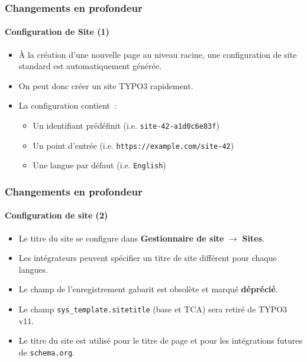 
\begin{frame}[fragile]
	\frametitle{Changements en profondeur}
	\framesubtitle{Configuration de Site (1)}

	\begin{itemize}
		\item À la création d'une nouvelle page au niveau racine, une configuration
			de site standard est automatiquement générée.
		\item On peut donc créer un site TYPO3 rapidement.
		\item La configuration contient~:

			\begin{itemize}
				\item Un identifiant prédéfinit (i.e. \texttt{site-42-a1d0c6e83f})
				\item Un point d'entrée (i.e. \texttt{https://example.com/site-42})
				\item Une langue par défaut (i.e. \texttt{English})
			\end{itemize}

	\end{itemize}

\end{frame}


\begin{frame}[fragile]
	\frametitle{Changements en profondeur}
	\framesubtitle{Configuration de site (2)}

	\begin{itemize}

		\item Le titre du site se configure dans
			\textbf{Gestionnaire de site} $\rightarrow$ \textbf{Sites}.
		\item Les intégrateurs peuvent spécifier un titre de site différent pour chaque langues.
		\item Le champ de l'enregistrement gabarit est obsolète et marqué \textbf{déprécié}.
		\item Le champ \texttt{sys\_template.sitetitle} (base et TCA) sera retiré de TYPO3 v11.
		\item Le titre du site est utilisé pour le titre de page et pour les intégrations futures de
			\texttt{schema.org}.
	\end{itemize}

\end{frame}


